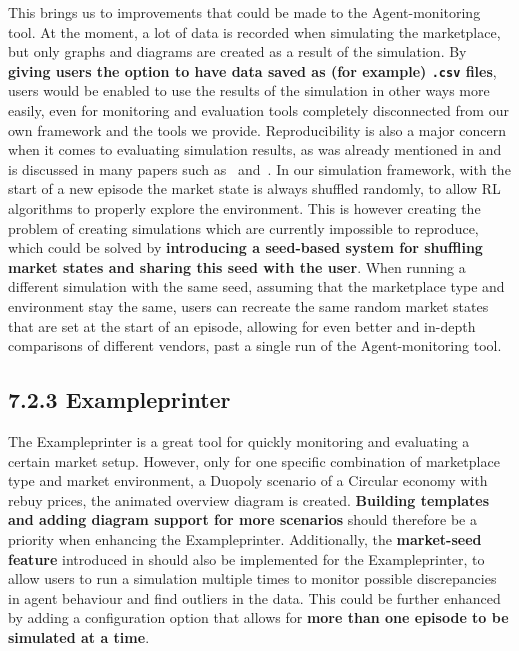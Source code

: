 This brings us to improvements that could be made to the Agent-monitoring tool. At the moment, a lot of data is recorded when simulating the marketplace, but only graphs and diagrams are created as a result of the simulation. By \textbf{giving users the option to have data saved as (for example) \texttt{.csv} files}, users would be enabled to use the results of the simulation in other ways more easily, even for monitoring and evaluation tools completely disconnected from our own framework and the tools we provide. Reproducibility is also a major concern when it comes to evaluating simulation results, as was already mentioned in  and is discussed in many papers such as~\cite{DRLThatMatters} and~\cite{ReproducibilityRL}. In our simulation framework, with the start of a new episode the market state is always shuffled randomly, to allow RL algorithms to properly explore the environment. This is however creating the problem of creating simulations which are currently impossible to reproduce, which could be solved by \textbf{introducing a seed-based system for shuffling market states and sharing this seed with the user}. When running a different simulation with the same seed, assuming that the marketplace type and environment stay the same, users can recreate the same random market states that are set at the start of an episode, allowing for even better and in-depth comparisons of different vendors, past a single run of the Agent-monitoring tool.

\subsection*{7.2.3 Exampleprinter}\label{subsec:FutureExampleprinter}

The Exampleprinter is a great tool for quickly monitoring and evaluating a certain market setup. However, only for one specific combination of marketplace type and market environment, a Duopoly scenario of a Circular economy with rebuy prices, the animated overview diagram is created. \textbf{Building templates and adding diagram support for more scenarios} should therefore be a priority when enhancing the Exampleprinter. Additionally, the \textbf{market-seed feature} introduced in  should also be implemented for the Exampleprinter, to allow users to run a simulation multiple times to monitor possible discrepancies in agent behaviour and find outliers in the data. This could be further enhanced by adding a configuration option that allows for \textbf{more than one episode to be simulated at a time}.


